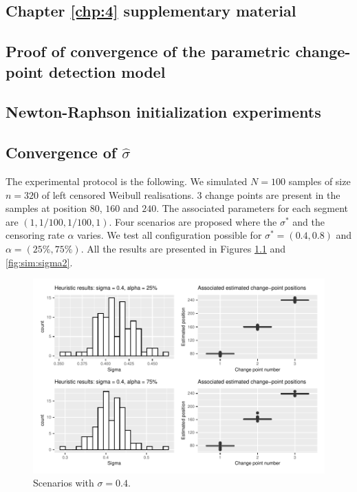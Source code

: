\begin{appendices}
\chapter{Chapter \ref{chp:4} supplementary material} \label{app:chap4}

\section{Proof of convergence of the parametric change-point detection model}\label{app:chap4:1}

\section{Newton-Raphson initialization experiments}\label{app:chap4:2}

\section{Convergence of \texorpdfstring{$\hat\sigma$}{s}}\label{app:chap4:3}

The experimental protocol is the following. We simulated $N = 100$ samples of size $n = 320$ of left censored Weibull realisations. 3 change points are present in the samples at position $80$, $160$ and $240$. The associated parameters for each segment are $(1,1/100,1/100,1)$. Four scenarios are proposed where the $\sigma^*$ and the censoring rate $\alpha$ varies. We test all configuration possible for $\sigma^* = (0.4,0.8)$ and $\alpha = (25\%,75\%)$. All the results are presented in Figures \ref{fig:sim:sigma1} and \ref{fig:sim:sigma2}.     

\begin{figure}[ht]
    \centering
    \includegraphics{figs/App/SIM_CHAP5_1.pdf}
    \caption{Scenarios with $\sigma = 0.4$.}
    \label{fig:sim:sigma1}
\end{figure}


\end{appendices}
